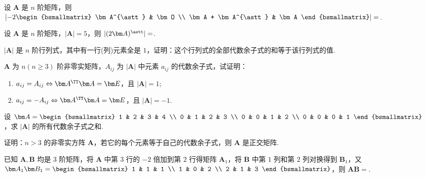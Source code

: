 	\begin{titwo}
		设 $\bm A$ 是 $n$ 阶矩阵，则 $\left| -2 \begin{bsmallmatrix}
			\bm A^{\astt} & \bm O \\
			\bm A + \bm A^{\astt} & \bm A
		\end{bsmallmatrix} \right| = $\kuo.

	\end{titwo}

	\begin{titwo}
		设 $\bm A$ 是 $n$ 阶矩阵，$|\bm A| = 5$，则 $|( 2 \bm A )^{\astt}| = $\htwo.
	\end{titwo}

	\begin{titwo}
		$|\bm A|$ 是 $n$ 阶行列式，其中有一行(列)元素全是 $1$，证明：这个行列式的全部代数余子式的和等于该行列式的值.
	\end{titwo}

	\begin{titwo}
		$\bm A$ 为 $n(n \geq 3)$ 阶非零实矩阵，$A_{ij}$ 为 $|\bm A|$ 中元素 $a_{ij}$ 的代数余子式，试证明：
		\begin{enumerate}
			\item $a_{ij} = A_{ij} \Leftrightarrow \bm A^{\TT} \bm A = \bm E$，且 $|\bm A| = 1$;
			\item $a_{ij} = -A_{ij} \Leftrightarrow \bm A^{\TT} \bm A = \bm E$，且 $|\bm A| = -1$.
		\end{enumerate}
	\end{titwo}

	\begin{titwo}
		设 $\bm A = \begin{bsmallmatrix}
			1 & 2 & 3 & 4 \\
			0 & 1 & 2 & 3 \\
			0 & 0 & 1 & 2 \\
			0 & 0 & 0 & 1
		\end{bsmallmatrix}$，求 $|\bm A|$ 的所有代数余子式之和.
	\end{titwo}

	\begin{titwo}
		证明：$n > 3$ 的非零实方阵 $\bm A$，若它的每个元素等于自己的代数余子式，则 $\bm A$ 是正交矩阵.
	\end{titwo}

	\begin{titwo}
		已知 $\bm A, \bm B$ 均是 $3$ 阶矩阵，将 $\bm A$ 中第 $3$ 行的 $-2$ 倍加到第 $2$ 行得矩阵 $\bm A_{1}$，将 $\bm B$ 中第 $1$ 列和第 $2$ 列对换得到 $\bm B_{1}$，又 $\bm A_{1} \bm B_{1} = \begin{bsmallmatrix}
			1 & 1 & 1 \\
			1 & 0 & 2 \\
			2 & 1 & 3
		\end{bsmallmatrix}$，则 $\bm A \bm B = $\htwo.
	\end{titwo}

